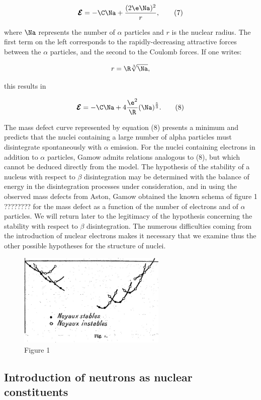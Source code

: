 \documentclass{article}
\newcommand{\const}[1]{#1}
\newcommand{\Etotal}{\pmb{\mathcal{E}}}
\newcommand{\nequ}[2]{
\begin{equation*}
#1
\tag{#2}
\end{equation*}
}
\newcommand{\uequ}[1]{
\begin{equation*}
#1
\end{equation*}
}
\begin{document}
\nequ{
\Etotal = -\C\Na + \frac{(2\e\Na)^2}{\const{r}},
}{7}

where $\Na$ represents the number of $\alpha$ particles and $\const{r}$ is the nuclear radius. The first term on the left corresponds to the rapidly-decreasing attractive forces between the $\alpha$ particles, and the second to the Coulomb forces. If one writes:

\uequ{
\const{r} = \R\sqrt[3]{\Na},
}

this results in

\nequ{
\Etotal = -\C\Na + 4\frac{\e^2}{\R}(\Na)^{\frac{5}{3}}.
}{8}

The mass defect curve represented by equation (8) presents a minimum and predicts that the nuclei containing a large number of alpha particles must disintegrate spontaneously with $\alpha$ emission. For the nuclei containing electrons in addition to $\alpha$ particles, Gamow admits relations analogous to (8), but which cannot be deduced directly from the model. The hypothesis of the stability of a nucleus with respect to $\beta$ disintegration may be determined with the balance of energy in the disintegration processes under consideration, and in using the observed mass defects from Aston, Gamow obtained the known schema of figure 1 ???????? for the mass defect as a function of the number of electrons and of $\alpha$ particles. We will return later to the legitimacy of the hypothesis concerning the stability with respect to $\beta$ disintegration.
The numerous difficulties coming from the introduction of nuclear electrons makes it necessary that we examine thus the other possible hypotheses for the structure of nuclei.

\begin{figure}[h!]
\centering
\includegraphics[width=200pt]{images/figure1}
{\caption*{Figure 1}}
\end{figure}

\subsection{Introduction of neutrons as nuclear constituents}
\end{document}
